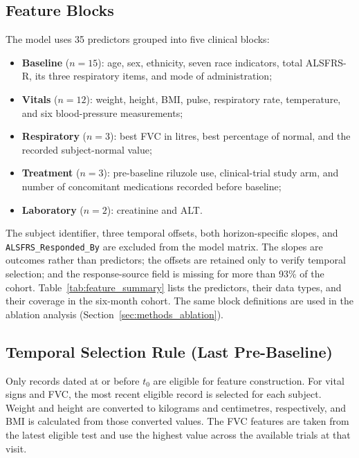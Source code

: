 \subsection{Feature Blocks}
\label{sec:methods_feature_blocks}
The model uses 35 predictors grouped into five clinical blocks:
\begin{itemize}
  \item \textbf{Baseline} ($n\!=\!15$): age, sex, ethnicity, seven race indicators, total \gls{ALSFRS-R}, its three respiratory items, and mode of administration;
  \item \textbf{Vitals} ($n\!=\!12$): weight, height, \gls{BMI}, pulse, respiratory rate, temperature, and six blood-pressure measurements;
  \item \textbf{Respiratory} ($n\!=\!3$): best \gls{FVC} in litres, best percentage of normal, and the recorded subject-normal value;
  \item \textbf{Treatment} ($n\!=\!3$): pre-baseline riluzole use, clinical-trial study arm, and number of concomitant medications recorded before baseline;
  \item \textbf{Laboratory} ($n\!=\!2$): creatinine and \gls{ALT}.
\end{itemize}
The subject identifier, three temporal offsets, both horizon-specific slopes, and \texttt{ALSFRS\_Responded\_By} are excluded from the model matrix. The slopes are outcomes rather than predictors; the offsets are retained only to verify temporal selection; and the response-source field is missing for more than 93\% of the cohort. Table~\ref{tab:feature_summary} lists the predictors, their data types, and their coverage in the six-month cohort. The same block definitions are used in the ablation analysis (Section~\ref{sec:methods_ablation}).



\subsection{Temporal Selection Rule (Last Pre-Baseline)}
\label{sec:methods_last_prebaseline}
Only records dated at or before $t_0$ are eligible for feature construction. For vital signs and \gls{FVC}, the most recent eligible record is selected for each subject. Weight and height are converted to kilograms and centimetres, respectively, and \gls{BMI} is calculated from those converted values. The FVC features are taken from the latest eligible test and use the highest value across the available trials at that visit.

